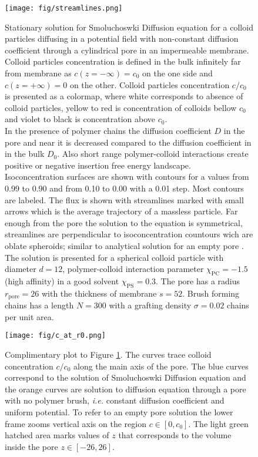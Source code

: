 \documentclass[12pt, a4paper]{article}
\begin{document}
\begin{figure}
    \centering
    \texttt{[image: fig/streamlines.png]}
    \caption{
    Stationary solution for Smoluchoswki Diffusion equation for a colloid particles diffusing in a potential field with non-constant diffusion coefficient through a cylindrical pore in an impermeable membrane. Colloid particles concentration is defined in the bulk infinitely far from membrane as $c(z=-\infty) = c_0$ on the one side and $c(z=+\infty) = 0$ on the other. Colloid particles concentration $c/c_0$ is presented as a colormap, where white corresponds to absence of colloid particles, yellow to red is concentration of colloids bellow $c_0$ and violet to black is concentration above $c_0$.
    \\
    In the presence of polymer chains the diffusion coefficient $D$ in the pore and near it is decreased compared to the diffusion coefficient in in the bulk $D_0$. Also short range polymer-colloid interactions create positive or negative insertion free energy landscape.
    \\
    Isoconcentration surfaces are shown with contours for a values from 0.99 to 0.90 and from 0.10 to 0.00 with a 0.01 step. Most contours are labeled.
    The flux is shown with streamlines marked with small arrows which is the average trajectory of a massless particle. 
    Far enough from the pore the solution to the equation is symmetrical, streamlines are perpendicular to isoconcentration countours wich are oblate spheroids; similar to analytical solution for an empty pore \cite{Brunn, 1984}. 
    \\
    The solution is presented for a spherical colloid particle with diameter $d = 12$, polymer-colloid interaction parameter $\chi_{\textrm{PC}} = -1.5$ (high affinity) in a good solvent $\chi_{\textrm{PS}} = 0.3$. 
    The pore has a radius $r_{\textrm{pore}} = 26$ with the thickness of membrane $s = 52$.
    Brush forming chains has a length $N=300$ with a grafting density $\sigma = 0.02$ chains per unit area.
    }
    \label{fig:streamlines}
\end{figure}


\begin{figure}
    \centering
    \texttt{[image: fig/c\_at\_r0.png]}
    \caption{
    Complimentary plot to Figure \ref{fig:streamlines}. 
    The curves trace colloid concentration $c/c_0$ along the main axis of the pore. 
    The blue curves correspond to the solution of Smoluchoswki Diffusion equation and the orange curves are solution to diffusion equation through a pore with no polymer brush, \textit{i.e.} constant diffusion coefficient and uniform potential.
    To refer to an empty pore solution the lower frame zooms vertical axis on the region $c \in [0, c_0]$.
    The light green hatched area marks values of $z$ that corresponds to the volume inside the pore $z\in [-26, 26]$.
    }
    \label{fig:c_at_r0}
\end{figure}
\end{document}
